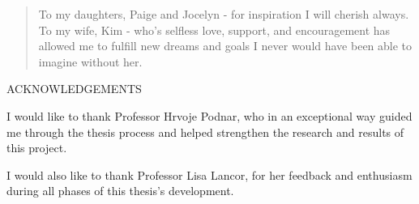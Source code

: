 \documentclass[12pt]{report}
\newenvironment{dedication}
	{\vspace{6ex}\begin{quotation}\begin{center}\begin{em}}
	{\par\end{em}\end{center}\end{quotation}}
\begin{document}
\begin{dedication}
\setcounter{page}{4}
\vspace*{\fill}
To my daughters, Paige and Jocelyn - for inspiration I will cherish always.
\linebreak\linebreak
To my wife, Kim - who’s selfless love, support, and encouragement has allowed me to fulfill new dreams and goals I never would have been able to imagine without her.
\vspace*{\fill}
\end{dedication}


\newpage
\thispagestyle{plain}
\setcounter{page}{5}
\vspace*{0in}
\begin{center}
\MakeTextUppercase{\large{Acknowledgements}} \\
\end{center}

I would like to thank Professor Hrvoje Podnar, who  in an exceptional way guided me through the thesis process and helped strengthen the research and results of this project.

I would also like to thank Professor Lisa Lancor, for her feedback and enthusiasm during all phases of this thesis's development.

\newpage


\tableofcontents
\newpage
\listoffigures



\end{document}
